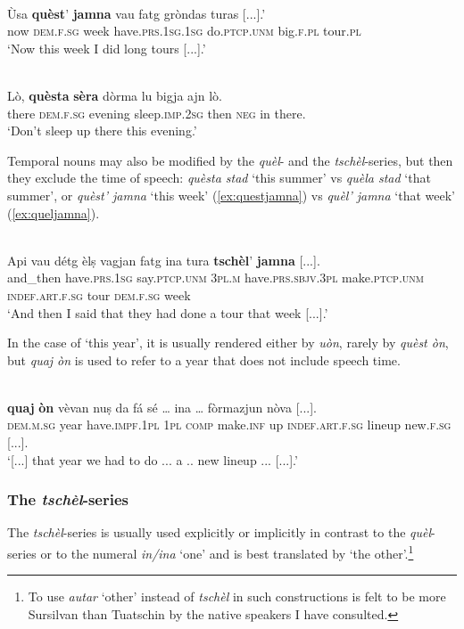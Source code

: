 \ea\label{ex:questjamna}
\\
\gll Ùsa \textbf{quèst}' \textbf{jamna} vau fatg gròndas turas [...].'\\
now \textsc{dem.f.sg} week have.\textsc{prs.1sg.1sg} do.\textsc{ptcp.unm} big.\textsc{f.pl} tour.\textsc{pl}\\
\glt `Now this week I did long tours [...].'
\z

\ea\label{}
\\
\gll Lò, \textbf{quèsta} \textbf{sèra} dòrma lu bigja ajn lò.\\
there \textsc{dem.f.sg} evening sleep.\textsc{imp.2sg} then  \textsc{neg} in there.\\
\glt `Don't sleep up there this evening.'
\z

Temporal nouns may also be modified by the \textit{quèl}- and the \textit{tschèl}-series, but then they exclude the time of speech: \textit{quèsta stad} `this summer' vs \textit{quèla stad} `that summer', or \textit{quèst' jamna} `this week' (\ref{ex:questjamna}) vs \textit{quèl' jamna} `that week'  (\ref{ex:queljamna}).

\ea\label{ex:queljamna}
\\
\gll Api vau détg èlṣ vagjan fatg ina tura \textbf{tschèl}’ \textbf{jamna} [...].\\  
and\_then have.\textsc{prs.1sg} say.\textsc{ptcp.unm} \textsc{3pl.m} have.\textsc{prs.sbjv.3pl} make.\textsc{ptcp.unm} \textsc{indef.art.f.sg} tour  \textsc{dem.f.sg} week\\
\glt `And then I said that they had done a tour that week [...].'
\z

In the case of `this year', it is usually rendered either by \textit{uòn}, rarely by  \textit{quèst òn}, but \textit{quaj òn} is used to refer to a year that does not include speech time.

\ea\label{}
\\
\gll [...] \textbf{quaj} \textbf{òn} vèvan nuṣ da fá sé … ina … fòrmazjun nòva [...].\\
{} \textsc{dem.m.sg} year have.\textsc{impf.1pl} \textsc{1pl} \textsc{comp} make.\textsc{inf} up {} \textsc{indef.art.f.sg} {} lineup  new.\textsc{f.sg} [...].\\
\glt `[...] that year we had to do ... a .. new lineup ... [...].'
\z


\subsubsection{The \textit{tschèl}-series}
The \textit{tschèl}-series is usually used explicitly or implicitly in contrast to the \textit{quèl}-series or to the numeral \textit{in/ina} `one' and is best translated by `the other'.\footnote{To use \textit{autar} `other' instead of \textit{tschèl} in such constructions is felt to be more Sursilvan than Tuatschin by the native speakers I have consulted.}

